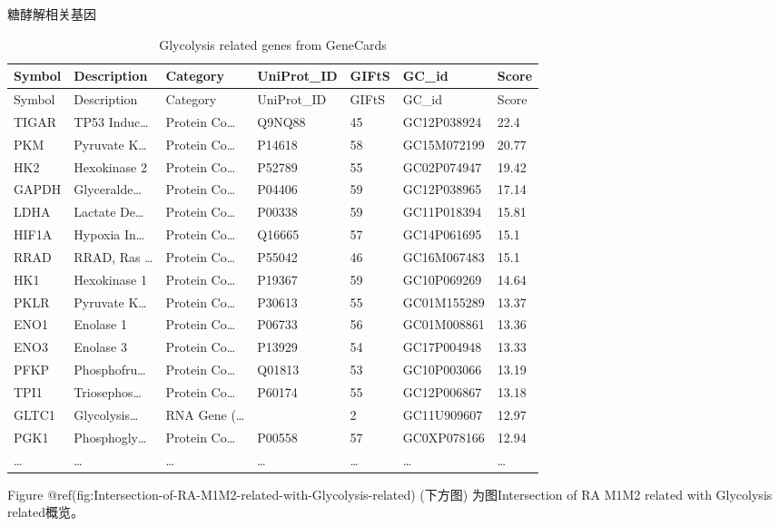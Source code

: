 \documentclass[
  ignorenonframetext,
]{beamer}
\begin{document}
\begin{frame}[fragile]{糖酵解相关基因}
\begin{longtable}[]{@{}lllllll@{}}
\caption{Glycolysis related genes from GeneCards}\tabularnewline
\toprule
Symbol & Description & Category & UniProt\_ID & GIFtS & GC\_id &
Score\tabularnewline
\midrule
\endfirsthead
\toprule
Symbol & Description & Category & UniProt\_ID & GIFtS & GC\_id &
Score\tabularnewline
\midrule
\endhead
TIGAR & TP53 Induc\ldots{} & Protein Co\ldots{} & Q9NQ88 & 45 &
GC12P038924 & 22.4\tabularnewline
PKM & Pyruvate K\ldots{} & Protein Co\ldots{} & P14618 & 58 &
GC15M072199 & 20.77\tabularnewline
HK2 & Hexokinase 2 & Protein Co\ldots{} & P52789 & 55 & GC02P074947 &
19.42\tabularnewline
GAPDH & Glyceralde\ldots{} & Protein Co\ldots{} & P04406 & 59 &
GC12P038965 & 17.14\tabularnewline
LDHA & Lactate De\ldots{} & Protein Co\ldots{} & P00338 & 59 &
GC11P018394 & 15.81\tabularnewline
HIF1A & Hypoxia In\ldots{} & Protein Co\ldots{} & Q16665 & 57 &
GC14P061695 & 15.1\tabularnewline
RRAD & RRAD, Ras \ldots{} & Protein Co\ldots{} & P55042 & 46 &
GC16M067483 & 15.1\tabularnewline
HK1 & Hexokinase 1 & Protein Co\ldots{} & P19367 & 59 & GC10P069269 &
14.64\tabularnewline
PKLR & Pyruvate K\ldots{} & Protein Co\ldots{} & P30613 & 55 &
GC01M155289 & 13.37\tabularnewline
ENO1 & Enolase 1 & Protein Co\ldots{} & P06733 & 56 & GC01M008861 &
13.36\tabularnewline
ENO3 & Enolase 3 & Protein Co\ldots{} & P13929 & 54 & GC17P004948 &
13.33\tabularnewline
PFKP & Phosphofru\ldots{} & Protein Co\ldots{} & Q01813 & 53 &
GC10P003066 & 13.19\tabularnewline
TPI1 & Triosephos\ldots{} & Protein Co\ldots{} & P60174 & 55 &
GC12P006867 & 13.18\tabularnewline
GLTC1 & Glycolysis\ldots{} & RNA Gene (\ldots{} & & 2 & GC11U909607 &
12.97\tabularnewline
PGK1 & Phosphogly\ldots{} & Protein Co\ldots{} & P00558 & 57 &
GC0XP078166 & 12.94\tabularnewline
\ldots{} & \ldots{} & \ldots{} & \ldots{} & \ldots{} & \ldots{} &
\ldots{}\tabularnewline
\bottomrule
\end{longtable}

\begin{center}\vspace{1.5cm}\end{center}

\begin{center}\vspace{1.5cm}\end{center}

Figure @ref(fig:Intersection-of-RA-M1M2-related-with-Glycolysis-related)
(下方图) 为图Intersection of RA M1M2 related with Glycolysis
related概览。


\end{frame}
\end{document}
